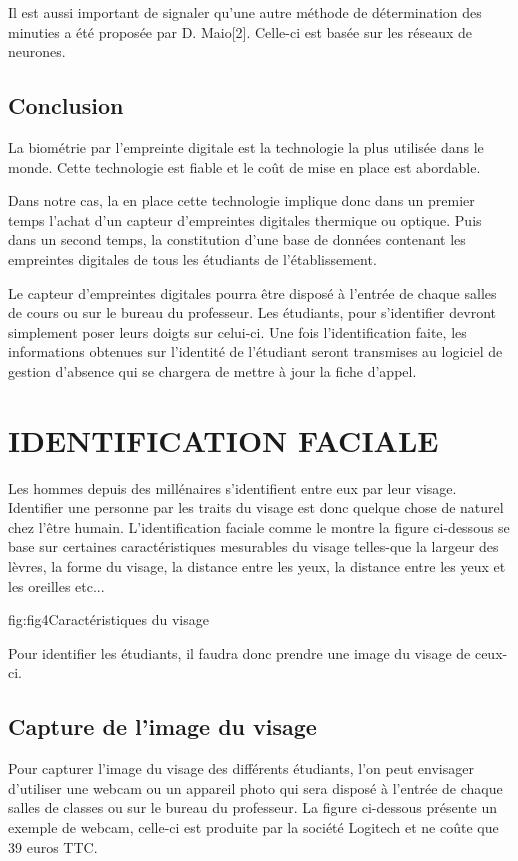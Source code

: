 \documentclass[overfullbox]{polytech/polytech}
\begin{document}
 
Il est aussi important de signaler qu'une autre méthode de détermination des minuties a été proposée par D. Maio[2]. Celle-ci est basée sur les réseaux de neurones. 
\subsection{Conclusion}

La biométrie par l’empreinte digitale est la technologie la plus utilisée dans le monde. Cette technologie est fiable et le coût de mise en place est abordable. 

Dans notre cas, la en place cette technologie implique donc dans un premier temps l'achat d'un capteur d'empreintes digitales thermique ou optique. Puis dans un second temps, la constitution d'une base de données contenant les empreintes digitales de tous les étudiants de l'établissement.

Le capteur d'empreintes digitales pourra être disposé à l'entrée de chaque salles de cours ou sur le bureau du professeur. Les étudiants, pour s'identifier devront simplement poser leurs doigts sur celui-ci. Une fois l'identification faite, les informations obtenues sur l'identité de l'étudiant seront transmises au logiciel de gestion d'absence qui se chargera de mettre à jour la fiche d'appel. 



\section{IDENTIFICATION FACIALE}
Les hommes depuis des millénaires s'identifient entre eux par leur visage. Identifier une personne par les traits du visage est donc quelque chose de naturel chez l'être humain. L'identification faciale comme le montre la figure ci-dessous se base sur certaines caractéristiques mesurables du visage telles-que la largeur des lèvres, la forme du visage, la distance entre les yeux, la distance entre les yeux et les oreilles etc...

\begin{Figure}{fig:fig4}{Caractéristiques du visage}
\end{Figure}



Pour identifier les étudiants, il faudra donc prendre une image du visage de ceux-ci. 

\subsection{Capture de l'image du visage}
Pour capturer l'image du visage des différents étudiants, l'on peut envisager d'utiliser une webcam ou un appareil photo qui sera disposé à l'entrée de chaque salles de classes ou sur le bureau du professeur. La figure ci-dessous présente un exemple de webcam, celle-ci est produite par la société Logitech et ne coûte que 39 euros TTC. 
\end{document}

